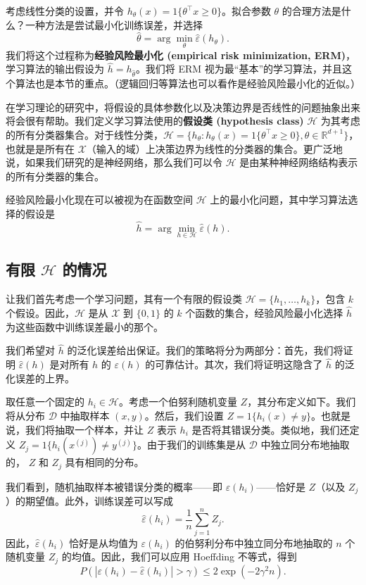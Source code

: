考虑线性分类的设置，并令 $h_\theta(x) = {1}\{\theta^\top x \geq 0\}$。拟合参数 $\theta$ 的合理方法是什么？一种方法是尝试最小化训练误差，并选择
\[
    \hat{\theta} = \arg \min_\theta \hat{\varepsilon}(h_\theta).
\]
我们将这个过程称为\textbf{经验风险最小化 (empirical risk minimization, ERM)}，学习算法的输出假设为 $\hat{h} = h_{\hat{\theta}}$。我们将 ERM 视为最“基本”的学习算法，并且这个算法也是本节的重点。（逻辑回归等算法也可以看作是经验风险最小化的近似。）

在学习理论的研究中，将假设的具体参数化以及决策边界是否线性的问题抽象出来将会很有帮助。我们定义学习算法使用的\textbf{假设类 (hypothesis class)} $\mathcal{H}$ 为其考虑的所有分类器集合。对于线性分类，$\mathcal{H} = \{h_\theta: h_\theta(x) = {1}\{\theta^\top x \geq 0\}, \theta \in \mathbb{R}^{d+1}\}$，也就是是所有在 $\mathcal{X}$（输入的域）上决策边界为线性的分类器的集合。更广泛地说，如果我们研究的是神经网络，那么我们可以令 $\mathcal{H}$ 是由某种神经网络结构表示的所有分类器的集合。

经验风险最小化现在可以被视为在函数空间 $\mathcal{H}$ 上的最小化问题，其中学习算法选择的假设是
\[
    \hat{h} = \arg \min_{h \in \mathcal{H}} \hat{\varepsilon}(h).
\]

\subsection{有限 \texorpdfstring{$\mathcal{H}$}{H} 的情况}

让我们首先考虑一个学习问题，其有一个有限的假设类 $\mathcal{H} = \{h_1, \dots, h_k\}$，包含 $k$ 个假设。因此，$\mathcal{H}$ 是从 $\mathcal{X}$ 到 $\{0, 1\}$ 的 $k$ 个函数的集合，经验风险最小化选择 $\hat{h}$ 为这些函数中训练误差最小的那个。

我们希望对 $\hat{h}$ 的泛化误差给出保证。我们的策略将分为两部分：首先，我们将证明 $\hat{\varepsilon}(h)$ 是对所有 $h$ 的 $\varepsilon(h)$ 的可靠估计。其次，我们将证明这隐含了 $\hat{h}$ 的泛化误差的上界。

取任意一个固定的 $h_i \in \mathcal{H}$。考虑一个伯努利随机变量 $Z$，其分布定义如下。我们将从分布 $\mathcal{D}$ 中抽取样本 $(x, y)$。然后，我们设置 $Z = {1}\{h_i(x) \neq y\}$。也就是说，我们将抽取一个样本，并让 $Z$ 表示 $h_i$ 是否将其错误分类。类似地，我们还定义 $Z_j = {1}\{h_i(x^{(j)}) \neq y^{(j)}\}$。由于我们的训练集是从 $\mathcal{D}$ 中独立同分布地抽取的， $Z$ 和 $Z_j$ 具有相同的分布。

我们看到，随机抽取样本被错误分类的概率——即 $\varepsilon(h_i)$——恰好是 $Z$（以及 $Z_j$）的期望值。此外，训练误差可以写成
\[
    \hat{\varepsilon}(h_i) = \frac{1}{n} \sum_{j=1}^n Z_j.
\]
因此，$\hat{\varepsilon}(h_i)$ 恰好是从均值为 $\varepsilon(h_i)$ 的伯努利分布中独立同分布地抽取的 $n$ 个随机变量 $Z_j$ 的均值。因此，我们可以应用 Hoeffding 不等式，得到
\[
    P(|\varepsilon(h_i) - \hat{\varepsilon}(h_i)| > \gamma) \leq 2 \exp(-2\gamma^2 n).
\]

